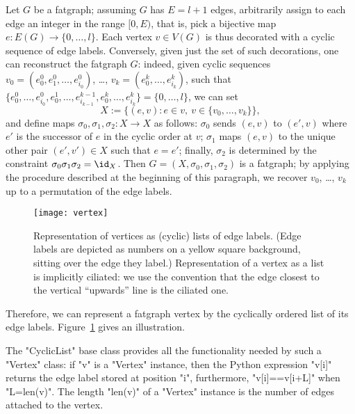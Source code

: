 Let $G$ be a fatgraph; assuming $G$ has $E = l+1$ edges, arbitrarily
assign to each edge an integer in the range $[0, E)$, that is, pick a
bijective map $e: E(G) \to \{0, \dots, l\}$.  Each vertex $v \in V(G)$
is thus decorated with a cyclic sequence of edge labels.  Conversely,
given just the set of such decorations, one can reconstruct the
fatgraph $G$: indeed, given cyclic sequences $v_0 = (e_0^0,
e^0_1, \ldots, e^0_{i_0})$, \ldots, $v_k = (e^k_0, \ldots,
e^k_{i_k})$, such that $\{e^0_0, \ldots, e^0_{i_0}, e^1_0, \ldots,
e^{k-1}_{i_{k-1}}, e^k_0, \ldots, e^k_{i_k}\} = \{0, \ldots, l\}$,
we can set
\begin{equation*}
  X := \{ (e, v) : e \in v,\: v\in \{v_0, \ldots, v_k\} \},
\end{equation*}
and define maps $\sigma_0, \sigma_1, \sigma_2: X \to X$ as follows:
$\sigma_0$ sends $(e, v)$ to $(e', v)$ where $e'$ is the successor of
$e$ in the cyclic order at $v$; $\sigma_1$ maps $(e, v)$ to the unique
other pair $(e', v') \in X$ such that $e = e'$; finally, $\sigma_2$ is
determined by the constraint $\sigma_0\sigma_1\sigma_2 = \id_X$.  Then
$G = (X, \sigma_0, \sigma_1, \sigma_2)$ is a fatgraph; by applying the
procedure described at the beginning of this paragraph, we recover
$v_0$, \ldots, $v_k$ up to a permutation of the edge labels.
\begin{figure}
  \centering
  \texttt{[image: vertex]}
  \caption{Representation of vertices as (cyclic) lists of edge
    labels.  (Edge labels are depicted as numbers on a yellow square
    background, sitting over the edge they label.)  Representation of
    a vertex as a list is implicitly ciliated: we use the convention
    that the edge closest to the vertical ``upwards'' line is the
    ciliated one.}
  \label{fig:vertex}
\end{figure}

Therefore, we can represent a fatgraph vertex by the cyclically
ordered list of its edge labels.  Figure~\ref{fig:vertex} gives an
illustration. 

The "CyclicList" base class provides all the functionality needed by
such a "Vertex" class: if "v" is a "Vertex" instance, then the
Python expression "v[i]" returns the edge label stored at
position "i", furthermore, "v[i]==v[i+L]" when "L=len(v)".
The length "len(v)" of a "Vertex" instance is the number of edges attached
to the vertex.  

